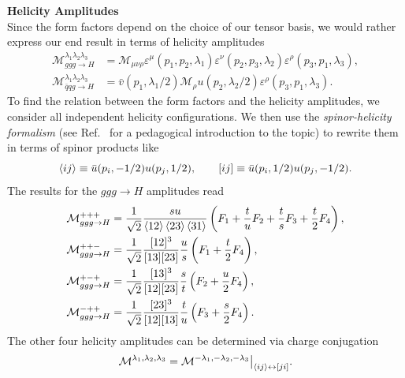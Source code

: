 \textbf{Helicity Amplitudes} \\
Since the form factors depend on the choice of our tensor basis, we would rather express our end result in terms of helicity amplitudes
\begin{equation}
\begin{split}
\mathcal{M}^{\lambda_1 \lambda_2 \lambda_3}_{ggg \rightarrow H} &= \mathcal{M}_{\mu \nu \rho} \varepsilon^\mu(p_1, p_2, \lambda_1) \varepsilon^\nu(p_2, p_3, \lambda_2) \varepsilon^\rho(p_3, p_1, \lambda_3), \\
\mathcal{M}^{\lambda_1 \lambda_2 \lambda_3}_{\bar{q}q g \rightarrow H} &= \bar{v}(p_1, \lambda_1/2) \mathcal{M}_{\rho} u(p_2, \lambda_2/2)  \varepsilon^\rho(p_3, p_1, \lambda_3).
\end{split}
\end{equation}
To find the relation between the form factors and the helicity amplitudes, we consider all independent helicity configurations. We then use the \textit{spinor-helicity formalism} (see Ref.~\cite{Dixon:1996wi} for a pedagogical introduction to the topic) to rewrite them in terms of spinor products like
\begin{equation}
\braket{ij} \equiv \bar{u}(p_i, -1/2) u(p_j, 1/2), \qquad [ij] \equiv \bar{u}(p_i, 1/2) u(p_j, -1/2).
\end{equation}
The results for the $ggg \rightarrow H$ amplitudes read
\begin{equation}
\begin{split}
\mathcal{M}_{ggg\rightarrow H}^{+++} &= \frac{1}{\sqrt{2}} \frac{s u}{\braket{12} \braket{23} \braket{31}} \left( F_1 + \frac{t}{u} F_2 + \frac{t}{s} F_3 + \frac{t}{2} F_4 \right), \\
\mathcal{M}_{ggg\rightarrow H}^{++-} &= \frac{1}{\sqrt{2}} \frac{[12]^3}{[13][23]} \frac{u}{s} \left(F_1 + \frac{t}{2} F_4 \right), \\
\mathcal{M}_{ggg\rightarrow H}^{+-+} &= \frac{1}{\sqrt{2}} \frac{[13]^3}{[12][23]} \frac{s}{t} \left(F_2 + \frac{u}{2} F_4 \right), \\
\mathcal{M}_{ggg\rightarrow H}^{-++} &= \frac{1}{\sqrt{2}} \frac{[23]^3}{[12][13]} \frac{t}{u} \left(F_3 + \frac{s}{2} F_4 \right).
\end{split}
\end{equation}
The other four helicity amplitudes can be determined via charge conjugation
\begin{equation}
\mathcal{M}^{\lambda_1, \lambda_2, \lambda_3} = \mathcal{M}^{-\lambda_1, - \lambda_2, -\lambda_3} \big \vert_{\braket{ij} \leftrightarrow [ji]}.
\label{eq:5:parity}
\end{equation}

